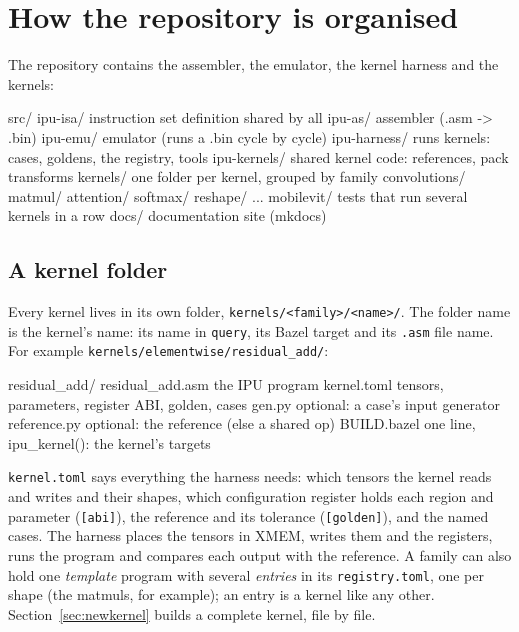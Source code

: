 \documentclass[11pt,a4paper]{article}
\begin{document}
\section{How the repository is organised}

The repository contains the assembler, the emulator, the kernel harness and
the kernels:

\begin{filetree}
src/
  ipu-isa/               instruction set definition shared by all
  ipu-as/             assembler (.asm -> .bin)
  ipu-emu/            emulator (runs a .bin cycle by cycle)
  ipu-harness/           runs kernels: cases, goldens, the registry, tools
  ipu-kernels/           shared kernel code: references, pack transforms
kernels/                 one folder per kernel, grouped by family
  convolutions/  matmul/  attention/  softmax/  reshape/  ...
  mobilevit/             tests that run several kernels in a row
docs/                    documentation site (mkdocs)
\end{filetree}

\subsection{A kernel folder}

Every kernel lives in its own folder, \texttt{kernels/<family>/<name>/}. The
folder name is the kernel's name: its name in \texttt{query}, its Bazel target
and its \texttt{.asm} file name. For example
\texttt{kernels/elementwise/residual\_add/}:

\begin{filetree}
residual_add/
  residual_add.asm   the IPU program
  kernel.toml        tensors, parameters, register ABI, golden, cases
  gen.py             optional: a case's input generator
  reference.py       optional: the reference (else a shared op)
  BUILD.bazel        one line, ipu_kernel(): the kernel's targets
\end{filetree}

\texttt{kernel.toml} says everything the harness needs: which tensors the
kernel reads and writes and their shapes, which configuration register holds each
region and parameter (\texttt{[abi]}), the reference and its tolerance
(\texttt{[golden]}), and the named cases. The harness places the tensors in
XMEM, writes them and the registers, runs the program and compares each output
with the reference. A family can also hold one \emph{template} program with
several \emph{entries} in its \texttt{registry.toml}, one per shape (the
matmuls, for example); an entry is a kernel like any other.
Section~\ref{sec:newkernel} builds a complete kernel, file by file.
\end{document}

